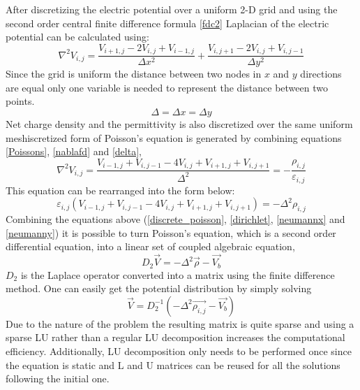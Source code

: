\begin{doublespace}
After discretizing the electric potential over a uniform 2-D grid and using the second order central finite difference formula \eqref{fdc2}  Laplacian of the electric potential can be calculated using\cite{NumModel}:
\begin{equation}
 \nabla^2 V_{i,j}=\frac{V_{i+1,j}-2V_{i,j}+V_{i-1,j}}{\Delta x^2}+\frac{V_{i,j+1}-2V_{i,j}+V_{i,j-1}}{\Delta y^2}
 \label{nablafd}
\end{equation}
Since the grid is uniform the distance between two nodes in $x$ and $y$ directions are equal  only one variable is needed to represent the distance between two points.
\begin{equation}
\Delta=\Delta x =\Delta y
\label{delta}
\end{equation}
Net charge density and the permittivity is also discretized over the same uniform meshiscretized form of Poisson's equation is generated by combining equations \ref{Poissons}, \ref{nablafd} and \ref{delta},
\begin{equation}
 \nabla^2 V_{i,j}=\frac{V_{i-1,j}+V_{i,j-1}-4V_{i,j}+V_{i+1,j}+V_{i,j+1}}{\Delta^2}=-\frac{\rho_{i,j}}{\varepsilon_{i,j}}
\end{equation}
This equation can be rearranged into the form below:
\begin{equation}
\varepsilon_{i,j}(V_{i-1,j}+V_{i,j-1}-4V_{i,j}+V_{i+1,j}+V_{i,j+1})=-\Delta^2\rho_{i,j}
\label{discrete_poisson}
\end{equation}
Combining the equations above (\ref{discrete_poisson}, \ref{dirichlet}, \ref{neumannx} and \ref{neumanny}) it is possible to turn Poisson's equation, which is a second order differential equation, into a linear set of coupled algebraic equation,
\begin{equation}
D_{2}\vec{V}=-\Delta^2\vec{\rho}-\vec{V_b}
\end{equation}
 $D_{2}$ is the Laplace operator converted into a matrix using the finite difference method. One can easily get the potential distribution by simply solving  
\begin{equation}
\vec{V}=D_{2}^{-1}(-\Delta^2\vec{\rho_{i,j}}-\vec{V_b})
\label{poimatrix}
\end{equation}
Due to the nature of the problem the resulting matrix  is quite sparse and using a sparse LU rather than a regular LU decomposition increases the computational efficiency. Additionally,  LU decomposition only needs to be performed once since the equation is static and  L and U matrices can be reused for all the solutions following the initial one. 


\end{doublespace}
